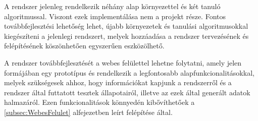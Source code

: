 A rendszer jelenleg rendelkezik néhány alap környezettel és két tanuló algoritmussal. Viszont ezek implementálása nem a projekt része. Fontos továbbfejlesztési lehetőség lehet, újabb környezetek és tanulási algoritmusokkal kiegészíteni a jelenlegi rendszert, melyek hozzáadása a rendszer tervezésének és felépítésének köszönhetően egyszerűen eszközölhető. 

A rendszer továbbfejlesztését a webes felülettel lehetne folytatni, amely jelen formájában egy prototípus és rendelkezik a legfontosabb alapfunkcionalitásokkal, melyek szükségesek ahhoz, hogy információkat kapjunk a rendszerről és a rendszer által futtatott tesztek állapotairól, illetve az ezek által generált adatok halmazáról. Ezen funkcionalitások könnyedén kibővíthetőek a \ref{subsec:WebesFelulet} alfejezetben leírt felépítése által.

